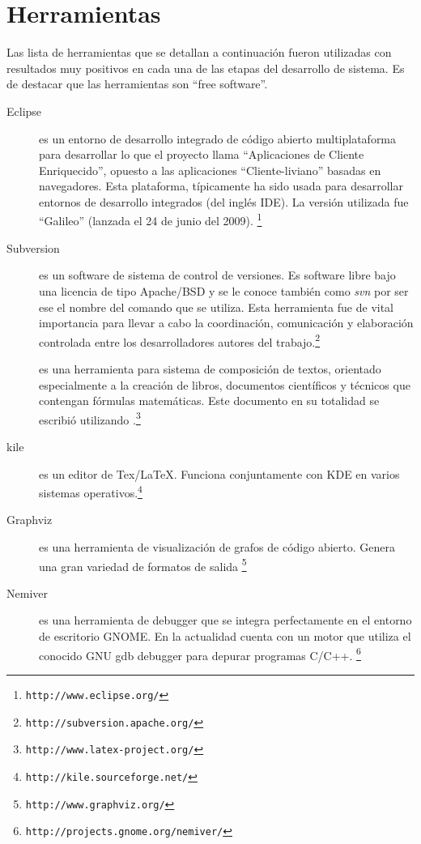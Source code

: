 \section{Herramientas}
Las lista de herramientas que se detallan a continuación fueron utilizadas con resultados muy positivos en cada una de las etapas del desarrollo de sistema. Es de destacar que las herramientas son ``free software''.  
\begin{description}


\item [Eclipse] es un entorno de desarrollo integrado de código abierto multiplataforma para desarrollar lo que el proyecto llama ``Aplicaciones de Cliente Enriquecido'', opuesto a las aplicaciones ``Cliente-liviano'' basadas en navegadores. Esta plataforma, típicamente ha sido usada para desarrollar entornos de desarrollo integrados (del inglés IDE). La versión utilizada fue ``Galileo'' (lanzada el 24 de junio del 2009).   \footnote{ {\tt http://www.eclipse.org/}}

\item [Subversion] es un software de sistema de control de versiones. Es software libre bajo una licencia de tipo Apache/BSD y se le conoce también como \textit{svn} por ser ese el nombre del comando que se utiliza. Esta herramienta fue de vital importancia para llevar a cabo la coordinación, comunicación y elaboración controlada entre los desarrolladores autores del trabajo.\footnote{ {\tt http://subversion.apache.org/}}

\item [\LaTeXe] es una herramienta para sistema de composición de textos, orientado especialmente a la creación de libros, documentos científicos y técnicos que contengan fórmulas matemáticas. Este documento en su totalidad se escribió utilizando \LaTeXe.\footnote{ {\tt http://www.latex-project.org/}}

\item [kile] es un editor de Tex/LaTeX. Funciona conjuntamente con KDE en varios sistemas operativos.\footnote{ {\tt http://kile.sourceforge.net/}}

\item [Graphviz] es una herramienta de visualización de grafos de código abierto. Genera una gran variedad de formatos de salida \footnote{ {\tt http://www.graphviz.org/}}

\item [Nemiver] es una herramienta de debugger que se integra perfectamente en el entorno de escritorio GNOME. En la actualidad cuenta con un motor que utiliza el conocido GNU gdb debugger para depurar programas C/C++. \footnote{ {\tt http://projects.gnome.org/nemiver/}}


\end{description}
